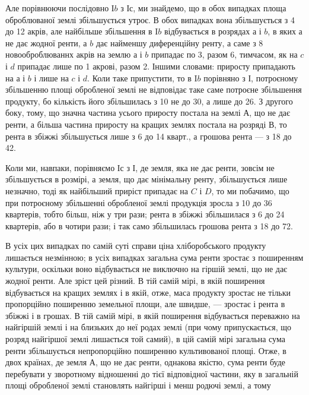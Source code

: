 Але порівнюючи послідовно І$b$ з І$с$, ми знайдемо, що в обох випадках площа
оброблюваної землі збільшується утроє. В обох випадках вона збільшується з
4 до 12 акрів, але найбільше збільшення в I$b$ відбувається в розрядах
$а$ і $b$, в яких $а$ не дає жодної ренти, а $b$ дає найменшу
диференційну ренту, а саме з 8 новооброблюваннх акрів на землю $а$ і $b$
припадає по 3, разом 6, тимчасом,
як на $c$ і $d$ припадає лише по 1 акрові, разом 2. Іншими словами:  приросту
припадають на $а$ і $b$ і лише  на $c$ і $d$. Коли таке припустити, то в
I$b$ порівняно з І, потроєному збільшенню площі обробленої землі не відповідає
таке саме потроєне збільшення продукту, бо кількість його збільшилась з 10
не до 30, а лише до 26. З другого боку, тому, що значна частина усього приросту
постала на землі $А$, що не дає ренти, а більша частина приросту на
кращих землях постала на розряді $В$, то рента в збіжжі збільшується лише
з 6 до 14 кварт., а грошова рента — з 18 до 42.

Коли ми, навпаки, порівняємо І$с$ з І, де земля, яка не дає ренти, зовсім
не збільшується в розмірі, а земля, що дає мінімальну ренту, збільшується
лише незначно, тоді як найбільший приріст припадає на $C$ і $D$, то ми побачимо,
що при потроєному збільшенні обробленої землі продукція зросла з 10 до
36 квартерів, тобто більш, ніж у три рази; рента в збіжжі збільшилася з 6 до
24 квартерів, або в чотири рази; і так само збільшилась грошова рента
з 18 до 72.

В усіх цих випадках по самій суті справи ціна хліборобського продукту
лишається незмінною; в усіх випадках загальна сума ренти зростає з поширенням
культури, оскільки воно відбувається не виключно на гіршій землі, що
не дає жодної ренти. Але зріст цей різний. В тій самій мірі, в якій поширення
відбувається на кращих землях і в якій, отже, маса продукту зростає не тільки
пропорційно поширенню земельної площи, але швидше, — зростає і рента в
збіжжі і в грошах. В тій самій мірі, в якій поширення відбувається переважно
на найгіршій землі і на близьких до неї родах землі (при чому припускається,
що розряд найгіршої землі лишається той самий), в цій самій мірі загальна
сума ренти збільшується непропорційно поширенню культивованої площі. Отже,
в двох країнах, де земля $А$, що не дає ренти, однакова якістю, сума ренти
буде перебувати у зворотному відношенні до тієї відповідної частини, яку в загальній
площі обробленої землі становлять найгірші і менш родючі землі, а тому

\parbreak{}  %
